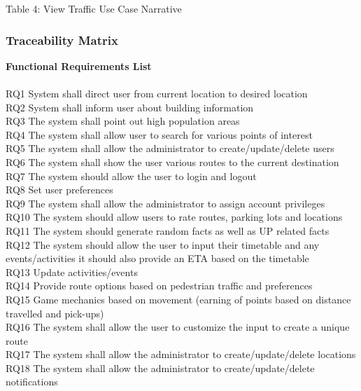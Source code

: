 \documentclass{article}
\begin{document}
\begin{center}
    	Table 4: View Traffic Use Case Narrative
\end{center}
		\subsubsection{Traceability Matrix}	
		{
			\noindent\textbf{Functional Requirements List}\\\\
			RQ1 System shall direct user from current location to desired location\\
			RQ2 System shall inform user about building information\\
			RQ3 The system shall point out high population areas\\
			RQ4 The system shall allow user to search for various points of interest\\
			RQ5 The system shall allow the administrator to create/update/delete users\\
			RQ6 The system shall show the user various routes to the current destination\\
			RQ7 The system should allow the user to login and logout\\
			RQ8 Set user preferences\\
			RQ9 The system shall allow the administrator to assign account privileges\\
			RQ10 The system should allow users to rate routes, parking lots and locations\\
			RQ11 The system should generate random facts as well as UP related facts\\
			RQ12 The system should allow the user to input their timetable and any events/activities it should also provide an ETA based on the timetable\\
			RQ13 Update activities/events\\
			RQ14 Provide route options based on pedestrian traffic and preferences\\
			RQ15 Game mechanics based on movement (earning of points based on distance travelled and pick-ups)\\
			RQ16 The system shall allow the user to customize the input to create a unique route\\
			RQ17 The system shall allow the administrator to create/update/delete locations\\
			RQ18 The system shall allow the administrator to create/update/delete notifications\\
}
\end{document}
